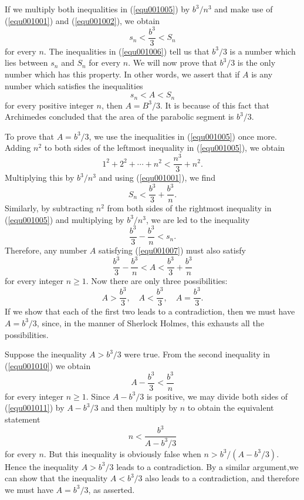 \documentclass[cn,11pt,chinese]{elegantbook}
\numberwithin{equation}{section}
\begin{document}
If we multiply both inequalities in (\ref{equ001005}) by $b^3/n^3$ and make use of (\ref{equ001001}) and (\ref{equ001002}), we obtain 
\begin{equation}\label{equ001006}
s_n < \frac{b^3}{3} < S_n
\end{equation}
for every $n$. The inequalities in (\ref{equ001006}) tell us that $b^3/3$ is a number which lies between $s_n$ and $S_n$ for every $n$. We will now prove that $b^3/3$ is the only number which has this property. In other words, we assert that if $A$ is any number which satisfies the inequalities
\begin{equation}\label{equ001007}
s_n < A < S_n
\end{equation}
for every positive integer $n$, then $A = B^3/3$. It is because of this fact that Archimedes concluded that the area of the parabolic segment is $b^3/3$.

To prove that $A = b^3/3$, we use the inequalities in (\ref{equ001005}) once more. Adding $n^2$ to both sides of the leftmost inequality in (\ref{equ001005}), we obtain
\[
1^2 + 2^2 + \cdots + n^2 < \frac{n^3}{3}+ n^2.
\]
Multiplying this by $b^3/n^3$ and using (\ref{equ001001}), we find
\begin{equation}\label{equ001008}
S_n < \frac{b^3}{3} + \frac{b^3}{n}.
\end{equation}
Similarly, by subtracting $n^2$ from both sides of the rightmost inequality in (\ref{equ001005}) and multiplying by $b^3/n^3$, we are led to the inequality
\begin{equation}\label{equ001009}
\frac{b^3}{3} - \frac{b^3}{n} < s_n.
\end{equation}
Therefore, any number $A$ satisfying (\ref{equ001007}) must also satisfy
\begin{equation}\label{equ001010}
\frac{b^3}{3} - \frac{b^3}{n} < A < \frac{b^3}{3} + \frac{b^3}{n}
\end{equation}
for every integer $n \ge 1$. Now there are only three possibilities:
\[
A > \frac{b^3}{3}, \quad A < \frac{b^3}{3}, \quad A = \frac{b^3}{3}.
\]
If we show that each of the first two leads to a contradiction, then we must have $A = b^3/3$, since, in the manner of Sherlock Holmes, this exhausts all the possibilities.

Suppose the inequality $A > b^3/3$ were true. From the second inequality in (\ref{equ001010}) we obtain
\begin{equation}\label{equ001011}
A - \frac{b^3}{3} < \frac{b^3}{n}
\end{equation}
for every integer $n \ge 1$. Since $A - b^3/3$ is positive, we may divide both sides of (\ref{equ001011}) by $A - b^3/3$ and then multiply by $n$ to obtain the equivalent statement
\[
n < \frac{b^3}{A - b^3/3}
\]
for every $n$. But this inequality is obviously false when $n > b^3/(A - b^3/3)$. Hence the inequality $A > b^3/3$ leads to a contradiction. By a similar argument,we can show that the inequality $A < b^3/3$ also leads to a contradiction, and therefore we must have $A = b^3/3$, as asserted.
\end{document}
